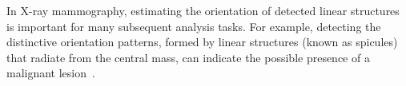 \label{s:review_orientation_mammography}
%
In X-ray mammography, estimating the orientation of detected linear structures~\cite{Zwiggelaar_etal_TMI04} is important for many subsequent analysis tasks. For example, detecting the distinctive orientation patterns, formed by linear structures (known as spicules) that radiate from the central mass, can indicate the possible presence of a malignant lesion~\cite{Zwiggelaar_etal_MIA99,Karssemeijer_teBrake_TMI96,Rangayyan_Ayres_MBEC06}.
